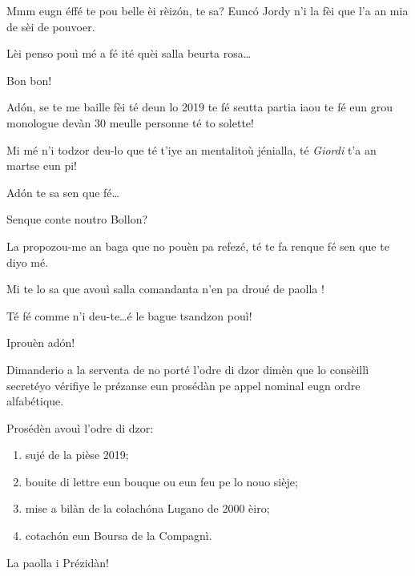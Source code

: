 \begin{drama}
\Secreteospeaks Mmm eugn éffé te pou belle èi rèiz\'on, te sa? Eunc\'o Jordy n'i la fèi que l’a an mia de sèi de pouvoer.

\Presidanspeaks {} Lèi penso pouì mé a fé ité quèi salla beurta rosa\ldots

\Secreteospeaks Bon bon!


\Jordyspeaks {} Ad\'on, se te me baille fèi té deun lo 2019 te fé seutta partia iaou te fé eun grou monologue devàn 30 meulle personne  té to solette!

\Cimaspeaks Mi mé n'i todzor deu-lo que té t'iye an mentalitoù jénialla, té \textit{Giordi} t’a an martse eun pi!

\Jordyspeaks Ad\'on te sa sen que fé\ldots


\Marcospeaks Senque conte noutro Bollon?

\Cimaspeaks La propozou-me an baga que no pouèn pa refezé, té te fa renque fé sen que te diyo mé.


\Sophiespeaks Mi te lo sa que avouì salla comandanta  n'en pa droué de paolla \quei!

\Jordyspeaks {} Té fé comme n'i deu-te\ldots é le bague tsandzon pouì!

\Sophiespeaks Iprouèn ad\'on!


\Presidanspeaks Dimanderio a la serventa de no porté l’odre di dzor dimèn que lo consèillì secretéyo vérifiye le prézanse eun prosédàn pe appel nominal eugn ordre alfabétique.


\Secreteospeaks Prosédèn avouì l’odre di dzor:
\begin{enumerate}
\item sujé de la pièse 2019;
\item bouite di lettre eun bouque ou eun feu pe lo nouo sièje;
\item mise a bilàn de la \og colach\'on\fg a Lugano  de 2000 èiro; 
\item cotach\'on eun Boursa de la Compagnì.
\end{enumerate}
La paolla i Prézidàn!


\end{drama}
